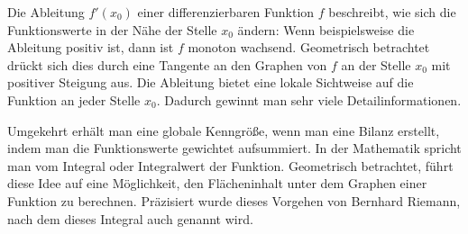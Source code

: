 \begin{MIntro}
Die Ableitung $f'(x_0)$ einer differenzierbaren Funktion $f$ beschreibt, 
wie sich die Funktionswerte {\glqq}in der Nähe{\grqq} der Stelle $x_0$ ändern:
Wenn beispielsweise die Ableitung positiv ist, dann ist $f$ monoton wachsend.
Geometrisch betrachtet drückt sich dies durch eine Tangente an den Graphen 
von $f$ an der Stelle $x_0$ mit positiver Steigung aus.
Die Ableitung bietet eine lokale Sichtweise auf die Funktion an jeder Stelle 
$x_0$. Dadurch gewinnt man sehr viele Detailinformationen.

Umgekehrt erhält man eine {\glqq}globale Kenngröße{\grqq}, wenn man eine 
{\glqq}Bilanz{\grqq} erstellt, indem man die Funktionswerte gewichtet 
aufsummiert. In der Mathematik spricht man vom Integral oder Integralwert
der Funktion.
Geometrisch betrachtet, führt diese Idee auf eine Möglichkeit, den 
Flächeninhalt unter dem Graphen einer Funktion zu berechnen.
Präzisiert wurde dieses Vorgehen von Bernhard Riemann, nach dem dieses 
Integral auch  genannt wird.
\end{MIntro}

